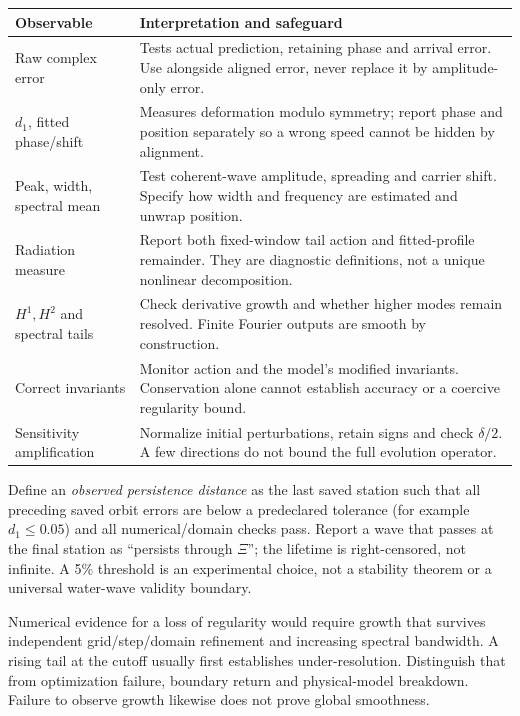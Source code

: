 \documentclass[11pt]{article}
\begin{document}
\begin{center}\small
\begin{tabular}{p{}p{}}\toprule
Observable & Interpretation and safeguard\\\midrule
Raw complex error & Tests actual prediction, retaining phase and arrival error.
Use alongside aligned error, never replace it by amplitude-only error.\\
$d_1$, fitted phase/shift & Measures deformation modulo symmetry; report phase
and position separately so a wrong speed cannot be hidden by alignment.\\
Peak, width, spectral mean & Test coherent-wave amplitude, spreading and carrier
shift. Specify how width and frequency are estimated and unwrap position.\\
Radiation measure & Report both fixed-window tail action and fitted-profile
remainder. They are diagnostic definitions, not a unique nonlinear decomposition.\\
$H^1,H^2$ and spectral tails & Check derivative growth and whether higher modes
remain resolved. Finite Fourier outputs are smooth by construction.\\
Correct invariants & Monitor action and the model's modified invariants.
Conservation alone cannot establish accuracy or a coercive regularity bound.\\
Sensitivity amplification & Normalize initial perturbations, retain signs and
check $\delta/2$. A few directions do not bound the full evolution operator.\\\bottomrule
\end{tabular}
\end{center}

Define an \emph{observed persistence distance} as the last saved station such
that all preceding saved orbit errors are below a predeclared tolerance
(for example $d_1\leq0.05$) and all numerical/domain checks pass. Report a wave
that passes at the final station as ``persists through $\Xi$''; the lifetime is
right-censored, not infinite. A 5\% threshold is an experimental choice,
not a stability theorem or a universal water-wave validity boundary.

Numerical evidence for a loss of regularity would require growth that survives
independent grid/step/domain refinement and increasing spectral bandwidth.
A rising tail at the cutoff usually first establishes under-resolution.
Distinguish that from optimization failure, boundary return and physical-model
breakdown. Failure to observe growth likewise does not prove global smoothness.
\end{document}
